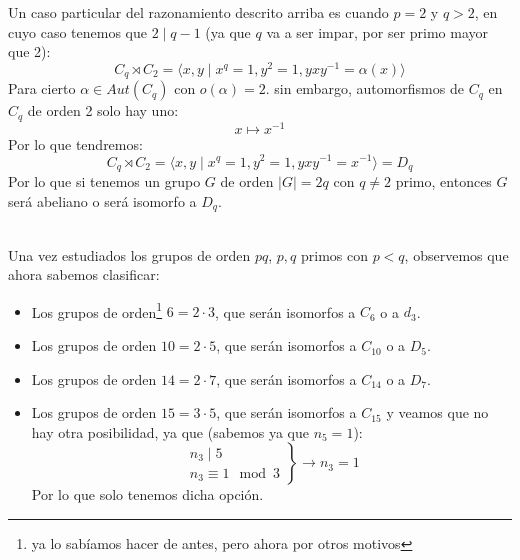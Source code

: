 \begin{ejemplo}
    Un caso particular del razonamiento descrito arriba es cuando $p = 2$ y $q >2$, en cuyo caso tenemos que $2 \mid q-1$ (ya que $q$ va a ser impar, por ser primo mayor que 2):
    \begin{equation*}
        C_q \rtimes C_2 = \langle x,y\mid x^q = 1, y^2 = 1, yxy^{-1} = \alpha(x) \rangle 
    \end{equation*}
    Para cierto $\alpha\in Aut(C_q)$ con $o(\alpha) = 2$. sin embargo, automorfismos de $C_q$ en $C_q$ de orden 2 solo hay uno:
    \begin{equation*}
        x \longmapsto x^{-1}
    \end{equation*}
    Por lo que tendremos:
    \begin{equation*}
        C_q \rtimes C_2 = \langle x,y \mid x^q = 1, y^2 = 1, yxy^{-1}=x^{-1} \rangle  = D_q
    \end{equation*}
    Por lo que si tenemos un grupo $G$ de orden $|G| = 2q$ con $q\neq 2$ primo, entonces $G$ será abeliano o será isomorfo a $D_q$.
\end{ejemplo}~\\

Una vez estudiados los grupos de orden $pq$, $p,q$ primos con $p<q$, observemos que ahora sabemos clasificar:
\begin{itemize}
    \item Los grupos de orden\footnote{ya lo sabíamos hacer de antes, pero ahora por otros motivos} $6 = 2\cdot 3$, que serán isomorfos a $C_6$ o a $d_3$.
    \item Los grupos de orden $10 = 2\cdot 5$, que serán isomorfos a $C_{10}$ o a $D_5$.
    \item Los grupos de orden $14 = 2\cdot 7$, que serán isomorfos a $C_{14}$ o a $D_7$.
    \item Los grupos de orden $15 = 3\cdot 5$, que serán isomorfos a $C_{15}$ y veamos que no hay otra posibilidad, ya que (sabemos ya que $n_5 = 1$):
        \begin{equation*}
            \left.\begin{array}{r}
                    n_3 \mid 5 \\
                    n_3 \equiv 1 \mod 3
            \end{array}\right\} \longrightarrow n_3 = 1
        \end{equation*}
        Por lo que solo tenemos dicha opción.
\end{itemize}

